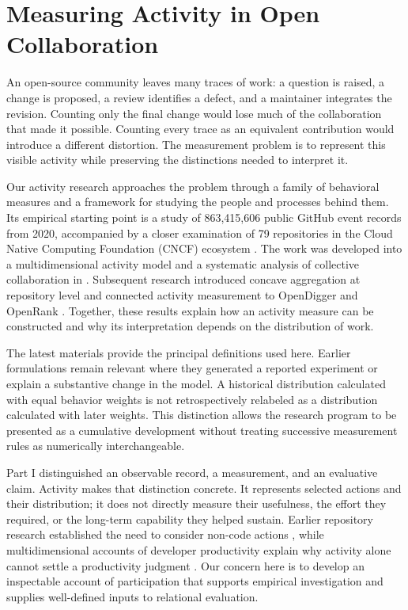 \chapter{Measuring Activity in Open Collaboration}
\label{ch:measurement}
\label{ch:four}

An open-source community leaves many traces of work: a question is raised, a change is proposed, a review identifies a defect, and a maintainer integrates the revision. Counting only the final change would lose much of the collaboration that made it possible. Counting every trace as an equivalent contribution would introduce a different distortion. The measurement problem is to represent this visible activity while preserving the distinctions needed to interpret it.

Our activity research approaches the problem through a family of behavioral measures and a framework for studying the people and processes behind them. Its empirical starting point is a study of 863,415,606 public GitHub event records from 2020, accompanied by a closer examination of 79 repositories in the Cloud Native Computing Foundation (CNCF) ecosystem \citep{xia2022}. The work was developed into a multidimensional activity model and a systematic analysis of collective collaboration in \citet[Chapter 5]{xia2024thesis}. Subsequent research introduced concave aggregation at repository level and connected activity measurement to OpenDigger and OpenRank \citep{han2024ose,zhao2025thesis,wang2026digger}. Together, these results explain how an activity measure can be constructed and why its interpretation depends on the distribution of work.

The latest materials provide the principal definitions used here. Earlier formulations remain relevant where they generated a reported experiment or explain a substantive change in the model. A historical distribution calculated with equal behavior weights is not retrospectively relabeled as a distribution calculated with later weights. This distinction allows the research program to be presented as a cumulative development without treating successive measurement rules as numerically interchangeable.

Part I distinguished an observable record, a measurement, and an evaluative claim. Activity makes that distinction concrete. It represents selected actions and their distribution; it does not directly measure their usefulness, the effort they required, or the long-term capability they helped sustain. Earlier repository research established the need to consider non-code actions \citep{gousios2008}, while multidimensional accounts of developer productivity explain why activity alone cannot settle a productivity judgment \citep{forsgren2021}. Our concern here is to develop an inspectable account of participation that supports empirical investigation and supplies well-defined inputs to relational evaluation.

